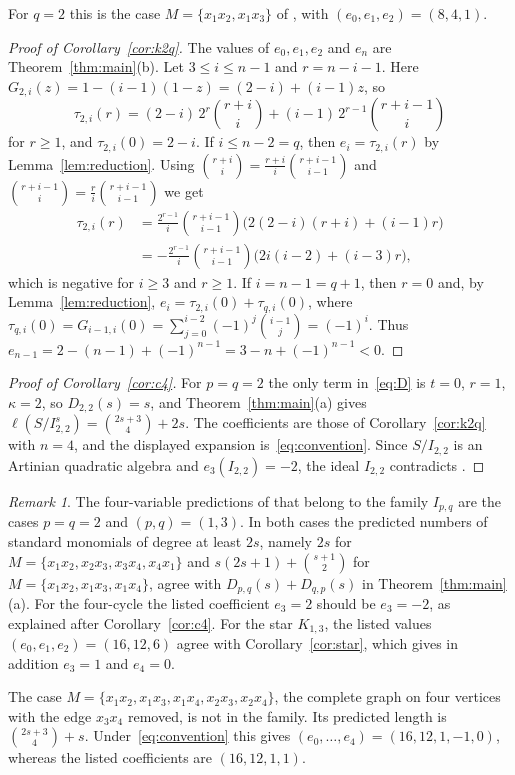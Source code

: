 \documentclass{amsart}
\theoremstyle{definition}
\theoremstyle{remark}
\newtheorem{remark}[theorem]{Remark}
\numberwithin{equation}{section}
\begin{document}
For $q=2$ this is the case $M=\{x_1x_2,x_1x_3\}$ of \cite[Theorem~3.1]{Fr},
with $(e_0,e_1,e_2)=(8,4,1)$.

\begin{proof}[Proof of Corollary~\ref{cor:k2q}]
The values of $e_0,e_1,e_2$ and $e_n$ are Theorem~\ref{thm:main}(b). Let
$3\le i\le n-1$ and $r=n-i-1$. Here $G_{2,i}(z)=1-(i-1)(1-z)=(2-i)+(i-1)z$, so
\[
  \tau_{2,i}(r)=(2-i)\,2^r\binom{r+i}{i}+(i-1)\,2^{r-1}\binom{r+i-1}{i}
\]
for $r\ge1$, and $\tau_{2,i}(0)=2-i$. If $i\le n-2=q$, then
$e_i=\tau_{2,i}(r)$ by Lemma~\ref{lem:reduction}. Using
$\binom{r+i}{i}=\frac{r+i}{i}\binom{r+i-1}{i-1}$ and
$\binom{r+i-1}{i}=\frac{r}{i}\binom{r+i-1}{i-1}$ we get
\begin{align*}
  \tau_{2,i}(r)&=\frac{2^{r-1}}{i}\binom{r+i-1}{i-1}\bigl(2(2-i)(r+i)+(i-1)r\bigr)\\
  &=-\frac{2^{r-1}}{i}\binom{r+i-1}{i-1}\bigl(2i(i-2)+(i-3)r\bigr),
\end{align*}
which is negative for $i\ge3$ and $r\ge1$. If $i=n-1=q+1$, then $r=0$ and, by
Lemma~\ref{lem:reduction}, $e_i=\tau_{2,i}(0)+\tau_{q,i}(0)$, where
$\tau_{q,i}(0)=G_{i-1,i}(0)=\sum_{j=0}^{i-2}(-1)^j\binom{i-1}{j}=(-1)^i$. Thus
$e_{n-1}=2-(n-1)+(-1)^{n-1}=3-n+(-1)^{n-1}<0$.
\end{proof}

\begin{proof}[Proof of Corollary~\ref{cor:c4}]
For $p=q=2$ the only term in~\eqref{eq:D} is $t=0$, $r=1$, $\kappa=2$, so
$D_{2,2}(s)=s$, and Theorem~\ref{thm:main}(a) gives
$\ell(S/I_{2,2}^s)=\binom{2s+3}{4}+2s$. The coefficients are those of
Corollary~\ref{cor:k2q} with $n=4$, and the displayed expansion
is~\eqref{eq:convention}. Since $S/I_{2,2}$ is an Artinian quadratic algebra
and $e_3(I_{2,2})=-2$, the ideal $I_{2,2}$ contradicts
\cite[Conjecture~1.1]{Fr}.
\end{proof}

\begin{remark}\label{rem:froberg}
The four-variable predictions of \cite[Conjecture~3.2]{Fr} that belong to the
family $I_{p,q}$ are the cases $p=q=2$ and $(p,q)=(1,3)$. In both cases the
predicted numbers of standard monomials of degree at least $2s$, namely $2s$
for $M=\{x_1x_2,x_2x_3,x_3x_4,x_4x_1\}$ and $s(2s+1)+\binom{s+1}{2}$ for
$M=\{x_1x_2,x_1x_3,x_1x_4\}$, agree with $D_{p,q}(s)+D_{q,p}(s)$ in
Theorem~\ref{thm:main}(a). For the four-cycle the listed coefficient $e_3=2$
should be $e_3=-2$, as explained after Corollary~\ref{cor:c4}. For the star
$K_{1,3}$, the listed values $(e_0,e_1,e_2)=(16,12,6)$ agree with
Corollary~\ref{cor:star}, which gives in addition $e_3=1$ and $e_4=0$.

The case $M=\{x_1x_2,x_1x_3,x_1x_4,x_2x_3,x_2x_4\}$, the complete graph on four
vertices with the edge $x_3x_4$ removed, is not in the family. Its predicted
length is $\binom{2s+3}{4}+s$. Under~\eqref{eq:convention} this gives
$(e_0,\dots,e_4)=(16,12,1,-1,0)$, whereas the listed coefficients are
$(16,12,1,1)$.
\end{remark}
\end{document}
